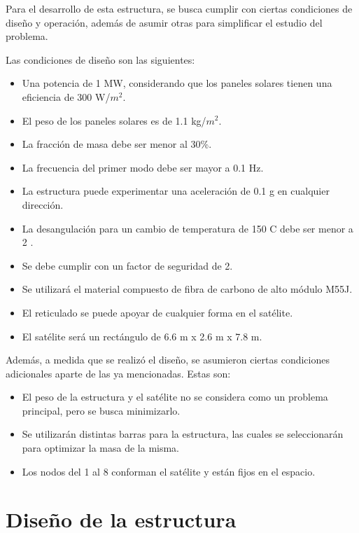 Para el desarrollo de esta estructura, se busca cumplir con ciertas condiciones de diseño y operación, además de asumir otras para simplificar el estudio del problema. 

Las condiciones de diseño son las siguientes:

\begin{itemize}
    \item Una potencia de 1 MW, considerando que los paneles solares tienen una eficiencia de 300 W/$m^2$.
    \item El peso de los paneles solares es de 1.1 kg/$m^2$.
    \item La fracción de masa debe ser menor al 30\%.
    \item La frecuencia del primer modo debe ser mayor a 0.1 Hz.
    \item La estructura puede experimentar una aceleración de 0.1 g en cualquier dirección.
    \item La desangulación para un cambio de temperatura de 150 \textdegree{}C debe ser menor a 2 \textdegree.
    \item Se debe cumplir con un factor de seguridad de 2.
    \item Se utilizará el material compuesto de fibra de carbono de alto módulo M55J.
    \item El reticulado se puede apoyar de cualquier forma en el satélite.
    \item El satélite será un rectángulo de 6.6 m x 2.6 m x 7.8 m.
\end{itemize}

Además, a medida que se realizó el diseño, se asumieron ciertas condiciones adicionales aparte de las ya mencionadas. Estas son:

\begin{itemize}
    \item El peso de la estructura y el satélite no se considera como un problema principal, pero se busca minimizarlo.
    \item Se utilizarán distintas barras para la estructura, las cuales se seleccionarán para optimizar la masa de la misma.
    \item Los nodos del 1 al 8 conforman el satélite y están fijos en el espacio.
\end{itemize}


\newpage
\section{Diseño de la estructura}

